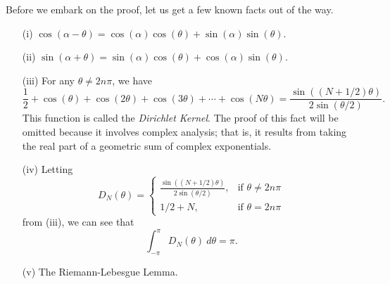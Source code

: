 Before we embark on the proof, let us get a few known facts out of the way.
\begin{enumerate}
    \item[(i)]  \( \cos(\alpha - \theta) = \cos(\alpha) \cos(\theta) + \sin(\alpha ) \sin(\theta)  \).
    \item[(ii)] \( \sin(\alpha + \theta) = \sin(\alpha) \cos(\theta) + \cos(\alpha) \sin(\theta). \)
    \item[(iii)] For any \( \theta \neq 2n \pi \), we have  
        \[ \frac{ 1 }{ 2 } + \cos(\theta) + \cos(2 \theta) + \cos(3 \theta) + \dotsb  + \cos(N \theta) = \frac{ \sin((N+1/2) \theta)  }{ 2 \sin(\theta / 2 )  }.   \] This function is called the \textit{Dirichlet Kernel}. The proof of this fact will be omitted because it involves complex analysis; that is, it results from taking the real part of a geometric sum of complex exponentials. 
    \item[(iv)] Letting 
        \[  D_{N}(\theta) = 
        \begin{cases}
            \frac{ \sin((N+1/2) \theta) }{ 2 \sin(\theta / 2 )  } , &\text{if } \theta \neq 2 n \pi \\         
            1 / 2 + N, &\text{if } \theta = 2n\pi 
        \end{cases} 
    \]
    from (iii), we can see that
    \[  \int_{ - \pi  }^{ \pi  } D_{N}(\theta)  \ d\theta = \pi. \]
\item[(v)] The Riemann-Lebesgue Lemma.
\end{enumerate}

